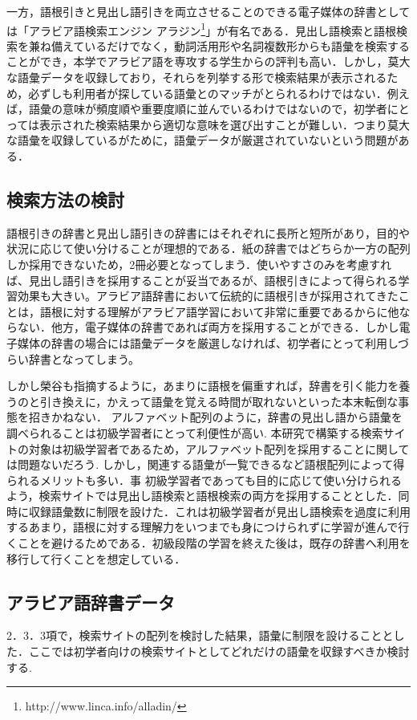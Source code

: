 \documentclass[technicalreport]{ieicej}
\begin{document}
一方，語根引きと見出し語引きを両立させることのできる電子媒体の辞書としては「アラビア語検索エンジン アラジン\footnote{http://www.linca.info/alladin/}」が有名である．見出し語検索と語根検索を兼ね備えているだけでなく，動詞活用形や名詞複数形からも語彙を検索することができ，本学でアラビア語を専攻する学生からの評判も高い．しかし，莫大な語彙データを収録しており，それらを列挙する形で検索結果が表示されるため，必ずしも利用者が探している語彙とのマッチがとられるわけではない．例えば，語彙の意味が頻度順や重要度順に並んでいるわけではないので，初学者にとっては表示された検索結果から適切な意味を選び出すことが難しい．つまり莫大な語彙を収録しているがために，語彙データが厳選されていないという問題がある．

\subsection{検索方法の検討}
語根引きの辞書と見出し語引きの辞書にはそれぞれに長所と短所があり，目的や状況に応じて使い分けることが理想的である．紙の辞書ではどちらか一方の配列しか採用できないため，2冊必要となってしまう．使いやすさのみを考慮すれば、見出し語引きを採用することが妥当であるが、語根引きによって得られる学習効果も大きい。アラビア語辞書において伝統的に語根引きが採用されてきたことは，語根に対する理解がアラビア語学習において非常に重要であるからに他ならない．他方，電子媒体の辞書であれば両方を採用することができる．しかし電子媒体の辞書の場合には語彙データを厳選しなければ、初学者にとって利用しづらい辞書となってしまう。

しかし榮谷\cite{sakaedani2008}も指摘するように，あまりに語根を偏重すれば，辞書を引く能力を養うのと引き換えに，かえって語彙を覚える時間が取れないといった本末転倒な事態を招きかねない．
アルファベット配列のように，辞書の見出し語から語彙を調べられることは初級学習者にとって利便性が高い.
本研究で構築する検索サイトの対象は初級学習者であるため，アルファベット配列を採用することに関しては問題ないだろう.
しかし，関連する語彙が一覧できるなど語根配列によって得られるメリットも多い．事 初級学習者であっても目的に応じて使い分けられるよう，検索サイトでは見出し語検索と語根検索の両方を採用することとした．同時に収録語彙数に制限を設けた．これは初級学習者が見出し語検索を過度に利用するあまり，語根に対する理解力をいつまでも身につけられずに学習が進んで行くことを避けるためである．初級段階の学習を終えた後は，既存の辞書へ利用を移行して行くことを想定している．

\subsection{アラビア語辞書データ}
2．3．3項で，検索サイトの配列を検討した結果，語彙に制限を設けることとした．ここでは初学者向けの検索サイトとしてどれだけの語彙を収録すべきか検討する.
\end{document}
